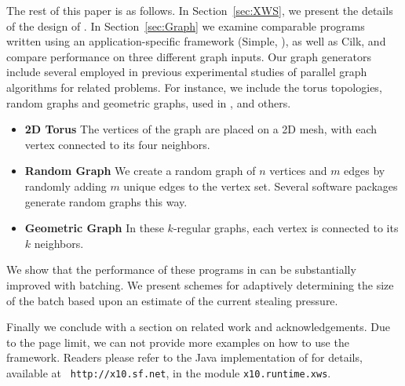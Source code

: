 The rest of this paper is as follows. In Section~\ref{sec:XWS}, we
present the details of the design of \XWS. In Section~\ref{sec:Graph}
we examine comparable programs written using an application-specific
framework (Simple, \cite{BC04a}), as well as Cilk, and compare
performance on three different graph inputs.  Our graph generators
include several employed in previous experimental studies of parallel
graph algorithms for related problems. For instance, we include the
torus topologies, random graphs and geometric graphs, used in \cite{Gre94}, \cite{HRD97} and others.

\begin{itemize}
\itemsep0pt
\item \textbf{2D Torus} The vertices of the graph are placed on a 2D
  mesh, with each vertex connected to its four neighbors.  

\item \textbf{Random Graph} We create a random graph of $n$ vertices
  and $m$ edges by randomly adding $m$ unique edges to the vertex
  set. Several software packages generate random graphs this way.
  
\item \textbf{Geometric Graph} In these $k$-regular graphs,
  each vertex is connected to its $k$ %
  neighbors.  
\end{itemize}


We show that the performance of these programs in \XWS{} can be
substantially improved with batching. We present schemes for
adaptively determining the size of the batch based upon an estimate of
the current stealing pressure.

Finally we conclude with a section on related work and
acknowledgements. Due to the page limit, we can not provide more
examples on how to use the \XWS{} framework. Readers please refer to
the Java implementation of \XWS{} for details, available at {\tt
http://x10.sf.net}, in the module {\tt x10.runtime.xws}.
